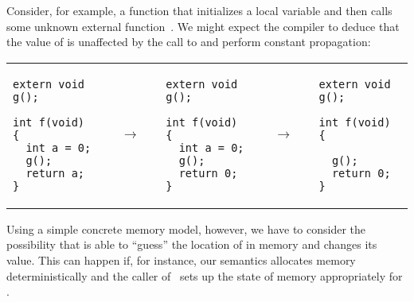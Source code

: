 Consider, for example, a function  that initializes a local variable  and then calls
some unknown external function~. We might expect the compiler to deduce that the value of
 is unaffected by the call to  and perform constant propagation:
\begin{center}
\begin{tabular}{@{}l@{}l@{}l@{}l@{}l@{}}
\begin{minipage}{0.2\textwidth}
\small
\begin{verbatim}
extern void g();

int f(void) {
  int a = 0;
  g();
  return a;
}
\end{verbatim}
\end{minipage}
&
$\quad\rightarrow\quad$
&
\begin{minipage}{0.2\textwidth}
\small
\begin{verbatim}
extern void g();

int f(void) {
  int a = 0;
  g();
  return 0;
}
\end{verbatim}
\end{minipage}
&
$\quad\rightarrow\quad$
&
\begin{minipage}{0.2\textwidth}
\small
\begin{verbatim}
extern void g();

int f(void) {

  g();
  return 0;
}
\end{verbatim}
\end{minipage}
\\
\end{tabular}
\end{center}

\vskip 0.3cm Using a simple concrete memory model, however, we have to consider the possibility that
 is able to ``guess'' the location of  in memory and changes its value. This can
happen if, for instance, our semantics allocates memory deterministically and the caller
of~ sets up the state of memory appropriately for .

